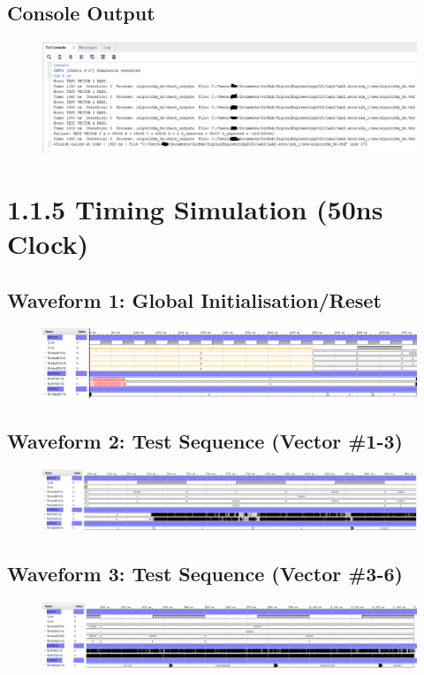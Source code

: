 \documentclass[11pt]{report}
\begin{document}
\subsection*{Console Output}
\begin{figure}[H]
    \includegraphics[width=\columnwidth]{Waveforms/120ns_timing_sim-console.png}
\end{figure}


\section*{1.1.5 Timing Simulation (50ns Clock)}
\subsection*{Waveform 1: Global Initialisation/Reset}
\begin{figure}[H]
    \includegraphics[width=\columnwidth]{Waveforms/50ns_timing_sim-global-reset.png}
\end{figure}
\subsection*{Waveform 2: Test Sequence (Vector \#1-3)}
\begin{figure}[H]
    \includegraphics[width=\columnwidth]{Waveforms/50ns_timing_sim-test-sequence-1-3.png}
\end{figure}
\subsection*{Waveform 3: Test Sequence (Vector \#3-6)}
\begin{figure}[H]
    \includegraphics[width=\columnwidth]{Waveforms/50ns_timing_sim-test-sequence-3-6.png}
\end{figure}
\end{document}
